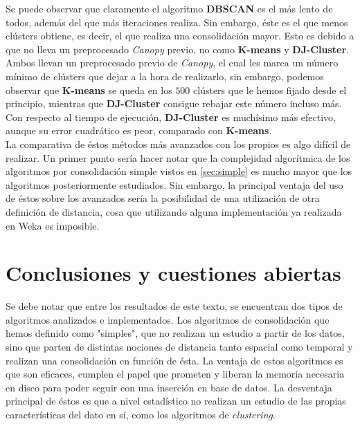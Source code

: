\documentclass[a4paper, 12pt]{article}
\begin{document}
\begin{center}
\end{center}

Se puede observar que claramente el algoritmo \textbf{DBSCAN} es el m\'as lento de todos, adem\'as del que m\'as iteraciones realiza. Sin embargo, \'este es el que menos cl\'usters obtiene, es decir, el que realiza una consolidaci\'on mayor. Esto es debido a que no lleva un preprocesado \textit{Canopy} previo, no como \textbf{K-means} y \textbf{DJ-Cluster}. Ambos llevan un preprocesado previo de \textit{Canopy}, el cual les marca un n\'umero m\'inimo de cl\'usters que dejar a la hora de realizarlo, sin embargo, podemos observar que \textbf{K-means} se queda en los $500$ cl\'usters que le hemos fijado desde el principio, mientras que \textbf{DJ-Cluster} consigue rebajar este n\'umero incluso m\'as. Con respecto al tiempo de ejecuci\'on, \textbf{DJ-Cluster} es much\'isimo m\'as efectivo, aunque su error cuadr\'atico es peor, comparado con \textbf{K-means}.\\

La comparativa de \'estos m\'etodos m\'as avanzados con los propios es algo dif\'icil de realizar. Un primer punto ser\'ia hacer notar que la complejidad algor\'itmica de los algoritmos por consolidaci\'on simple vistos en \ref{sec:simple} es mucho mayor que los algoritmos posteriormente estudiados. Sin embargo, la principal ventaja del uso de \'estos sobre los avanzados ser\'ia la posibilidad de una utilizaci\'on de otra definici\'on de distancia, cosa que utilizando alguna implementaci\'on ya realizada en Weka es imposible.\\


\pagebreak
\section{Conclusiones y cuestiones abiertas}

Se debe notar que entre los resultados de este texto, se encuentran dos tipos de algoritmos analizados e implementados. Los algoritmos de consolidaci\'on que hemos definido como "simples", que no realizan un estudio a partir de los datos, sino que parten de distintas nociones de distancia tanto espacial como temporal y realizan una consolidaci\'on en funci\'on de \'esta. La ventaja de estos algoritmos es que son eficaces, cumplen el papel que prometen y liberan la memoria necesaria en disco para poder seguir con una inserci\'on en base de datos. La desventaja principal de \'estos es que a nivel estad\'istico no realizan un estudio de las propias caracter\'isticas del dato en s\'i, como los algoritmos de \textit{clustering}.\\
\end{document}

